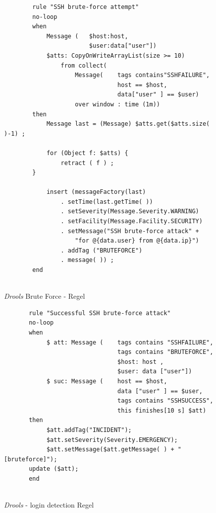 \begin{figure}[h]
    \caption{\textit{Drools} Brute Force - Regel}
    \label{app:drools-warning}\vspace{0.2cm}
    \centering
    \begin{minipage}{0.8\textwidth}
\begin{verbatim}
        rule "SSH brute-force attempt"
        no-loop
        when
            Message (   $host:host,
                        $user:data["user"])
            $atts: CopyOnWriteArrayList(size >= 10)
                from collect(
                    Message(    tags contains"SSHFAILURE",
                                host == $host,
                                data["user" ] == $user)
                    over window : time (1m))
        then
            Message last = (Message) $atts.get($atts.size( )-1) ;
        
            for (Object f: $atts) {
                retract ( f ) ;
        }
        
            insert (messageFactory(last)
                . setTime(last.getTime( ))
                . setSeverity(Message.Severity.WARNING)
                . setFacility(Message.Facility.SECURITY)
                . setMessage("SSH brute-force attack" +
                    "for @{data.user} from @{data.ip}")
                . addTag ("BRUTEFORCE")
                . message( )) ;
        end        
        
\end{verbatim}
\end{minipage}
\end{figure}

\begin{figure}[h]
    \caption{\textit{Drools} - login detection Regel}
    \label{app:drools-emergency}\vspace{0.2cm}
    \centering
    \begin{minipage}{0.8\textwidth}
\begin{verbatim}
       rule "Successful SSH brute-force attack"
       no-loop
       when
            $ att: Message (    tags contains "SSHFAILURE",
                                tags contains "BRUTEFORCE",
                                $host: host ,
                                $user: data ["user"])
            $ suc: Message (    host == $host,
                                data ["user" ] == $user,
                                tags contains "SSHSUCCESS",
                                this finishes[10 s] $att)
       then
            $att.addTag("INCIDENT");
            $att.setSeverity(Severity.EMERGENCY);
            $att.setMessage($att.getMessage( ) + "[bruteforce]");
       update ($att);
       end
        
\end{verbatim}
\end{minipage}
\end{figure}

